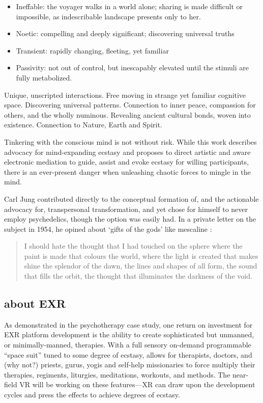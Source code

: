 \documentclass{UIdahoMastersThesis}
\begin{document}
\begin{itemize}
  \item Ineffable: the voyager walks in a world alone; sharing is made difficult or impossible, as indescribable landscape presents only to her.
  \item Noetic: compelling and deeply significant; discovering universal truths
  \item Transient: rapidly changing, fleeting, yet familiar
  \item Passivity: not out of control, but inescapably elevated until the stimuli are fully metabolized. 
\end{itemize}

Unique, unscripted interactions. Free moving in strange yet familiar cognitive space. Discovering universal patterns. Connection to inner peace, compassion for others, and the wholly numinous. Revealing ancient cultural bonds, woven into existence. Connection to Nature, Earth and Spirit.

Tinkering with the conscious mind is not without risk. While this work describes advocacy for mind-expanding ecstasy and proposes to direct artistic and aware electronic mediation to guide, assist and evoke ecstasy for willing participants, there is an ever-present danger when unleashing chaotic forces to mingle in the mind. 

Carl Jung contributed directly to the conceptual formation of, and the actionable advocacy for, transpersonal transformation, and yet chose for himself to never employ psychedelics, though the option was easily had. In a private letter on the subject in 1954, he opined about `gifts of the gods' like mescaline \cite{noauthor_carl_nodate}:

\begin{quote}
{I should hate the thought that I had touched on the sphere where the paint is made that colours the world, where the light is created that makes shine the splendor of the dawn, the lines and shapes of all form, the sound that fills the orbit, the thought that illuminates the darkness of the void.}
\end{quote}

\subsection{about EXR}

As demonstrated in the psychotherapy case study, one return on investment for EXR platform development is the ability to create sophisticated but unmanned, or minimally-manned, therapies. With a full sensory on-demand programmable ``space suit'' tuned to some degree of ecstasy, allows for therapists, doctors, and (why not?) priests, gurus, yogis and self-help missionaries to force multiply their therapies, regiments, liturgies, meditations, workouts, and methods. The near-field VR will be working on these features---XR can draw upon the development cycles and press the effects to achieve degrees of ecstasy.
\end{document}
